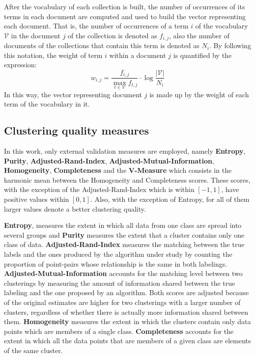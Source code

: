 \documentclass[a4paper]{article}
\begin{document}
After the vocabulary of each collection is built, the number of occurrences of its terms in each document are computed and used to build the vector representing each document. That is, the number of occurrences of a term $i$ of the  vocabulary $\mathcal{V}$ in the document $j$ of the collection is denoted as $f_{i,j}$, also the number of documents of the collections that contain this term is denoted as $N_{i}$. By following this notation, the weight of term $i$ within a document $j$ is quantified by the expression:\[w_{i,j}=\frac{f_{i,j}}{ \operatorname*{max}_{t\in \mathcal{V}}f_{t,j} }\cdot\log\frac{|\mathcal{V}|}{N_{i}}\] In this way, the vector representing document $j$ is made up by the weight of each term of the vocabulary in it.

\subsection*{Clustering quality measures}
In this work, only external validation measures are employed, namely \textbf{Entropy}, \textbf{Purity}, \textbf{Adjusted-Rand-Index}, \textbf{Adjusted-Mutual-Information}, \textbf{Homogeneity}, \textbf{Completeness} and the \textbf{V-Measure} which consists in the harmonic mean between the Homogeneity and Completeness scores. These scores, with the exception of  the Adjusted-Rand-Index which is within $[-1,1]$,  have positive values within $[0,1]$. Also, with the exception of Entropy, for all of them larger values denote a better clustering quality.

\textbf{Entropy}, measures the extent in which all data from one class are spread into several groups and 
\textbf{Purity} measures the extent that a cluster contains only one class of data. 
\textbf{Adjusted-Rand-Index} measures the matching between the true labels and the ones produced by the algorithm under study by counting the proportion of point-pairs whose relationship is the same in both labelings.
\textbf{Adjusted-Mutual-Information}  accounts for the matching level between two clusterings by measuring the amount of information shared between the true labeling and the one proposed by an algorithm. Both scores are adjusted because of the original estimates are higher for two clusterings with a larger number of clusters, regardless of whether there is actually more information shared between them.
\textbf{Homogeneity} measures the extent in which the clusters contain only data points which are members of a single class. 
\textbf{Completeness} accounts for the extent in which all the data points that are members of a given class are elements of the same cluster.
\end{document}
